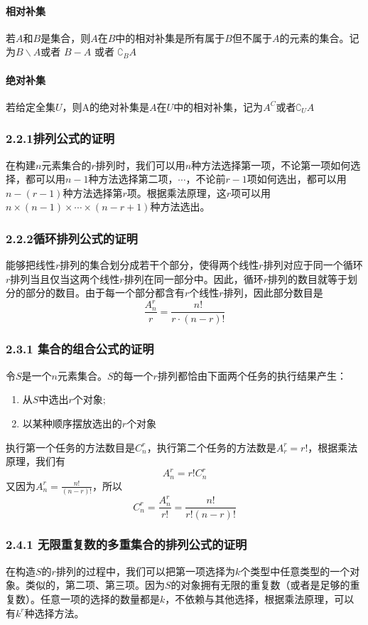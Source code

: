 \documentclass{ctexart}
\begin{document}
    \paragraph{相对补集}若$A$和$B$是集合，则$A$在$B$中的相对补集是所有属于$B$但不属于$A$的元素的集合。记为$B \backslash A$或者 $B - A$  或者 $\complement_B A$
    \paragraph{绝对补集}若给定全集$U$，则A的绝对补集是$A$在$U$中的相对补集，记为$A^C$或者$\complement_U A$
    \subsubsection{2.2.1排列公式的证明}
   在构建$n$元素集合的$r$排列时，我们可以用$n$种方法选择第一项，不论第一项如何选择，都可以用$n-1$种方法选择第二项，$\cdots$，不论前$r-1$项如何选出，都可以用$n-(r-1)$种方法选择第$r$项。根据乘法原理，这$r$项可以用$n \times (n-1) \times \cdots \times (n-r+1)$种方法选出。
    \subsubsection{2.2.2循环排列公式的证明}
   能够把线性$r$排列的集合划分成若干个部分，使得两个线性$r$排列对应于同一个循环$r$排列当且仅当这两个线性$r$排列在同一部分中。因此，循环$r$排列的数目就等于划分的部分的数目。由于每一个部分都含有$r$个线性$r$排列，因此部分数目是
   \[\frac{A_n^r}{r} = \frac{n!}{r \cdot (n-r)!}\]
   \subsubsection{2.3.1 集合的组合公式的证明}
   令$S$是一个$n$元素集合。$S$的每一个$r$排列都恰由下面两个任务的执行结果产生：
   \begin{enumerate}
       \item 从$S$中选出$r$个对象;
       \item 以某种顺序摆放选出的$r$个对象
   \end{enumerate}
   执行第一个任务的方法数目是$C_n^r$，执行第二个任务的方法数是$A_r^r = r!$，根据乘法原理，我们有
   \[A_n^r = r!C_n^r\]
   又因为$A_n^r = \frac{n!}{(n-r)!}$，所以
   \[C_n^r = \frac{A_n^r}{r!} = \frac{n!}{r!(n-r)!}\]
   \subsubsection{2.4.1 无限重复数的多重集合的排列公式的证明}
   在构造$S$的$r$排列的过程中，我们可以把第一项选择为$k$个类型中任意类型的一个对象。类似的，第二项、第三项。因为$S$的对象拥有无限的重复数（或者是足够的重复数）。任意一项的选择的数量都是$k$，不依赖与其他选择，根据乘法原理，可以有$k^r$种选择方法。
\end{document}
